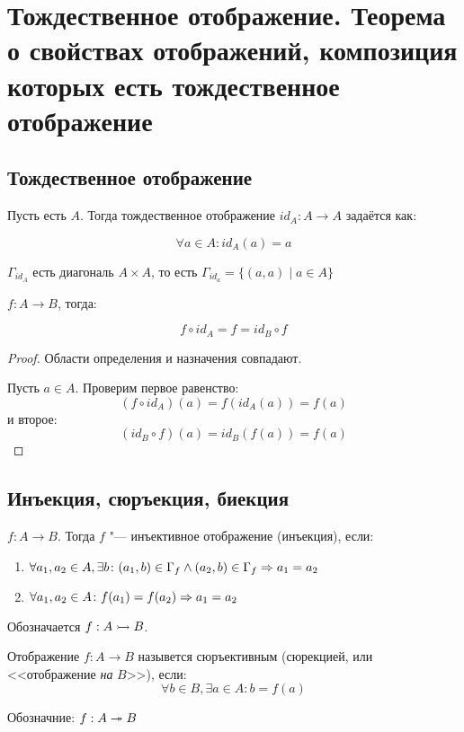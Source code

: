 ﻿\section{Тождественное отображение. Теорема о свойствах отображений, композиция которых есть
тождественное отображение}

\subsection{Тождественное отображение}

\begin{Def} Пусть есть $A$. Тогда тождественное отображение $id_{A}: A \to A$ задаётся как:

\[\forall a \in A\colon id_A(a) = a\]

$\Gamma_{id_A}$ есть диагональ $A \times A$, то есть $\Gamma_{id_a} = \{(a, a) \mid a \in A\}$
\end{Def}

\begin{theorem}{}
$f: A \to B$, тогда:

\[f \circ id_A = f =  id_B \circ f\]
\end{theorem}

\begin{proof}

Области определения и назначения совпадают.

Пусть $a \in A$. Проверим первое равенство:
\[(f \circ id_A)(a) = f(id_A(a)) = f(a)\]
и второе:
\[(id_B \circ f)(a) = id_B(f(a)) = f(a)\]
\end{proof}

\subsection{Инъекция, сюръекция, биекция}
\begin{Def}
$f: A \to B$. Тогда $f$ "--- инъективное отображение (инъекция), если:

\begin{enumerate}
\item $\forall a_1, a_2 \in A, \exists b\colon (a_1, b) \in \Gamma_f \wedge (a_2, b) \in \Gamma_f \Rightarrow a_1 = a_2$
\item $\forall a_1, a_2 \in A\colon f(a_1) = f(a_2) \Rightarrow a_1 = a_2$
\end{enumerate}

Обозначается $f: A \rightarrowtail B$.
\end{Def}

\begin{Def}
Отображение $f: A \to B$ назывется сюръективным (сюрекцией, или <<отображение \textit{на} $B$>>), если:
\[\forall b \in B, \exists a \in A\colon b = f(a)\]

Обозначние: $f: A \twoheadrightarrow B$
\end{Def}

